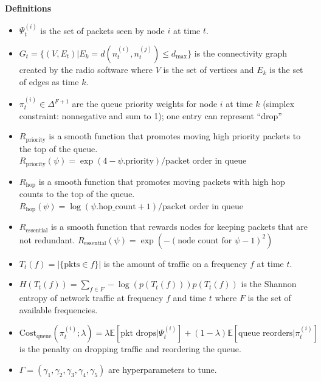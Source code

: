 \documentclass{article}
\begin{document}
\textbf{Definitions}
\begin{itemize}
    \item $\Psi_{t}^{(i)}$ is the set of packets seen by node $i$ at time $t$.
    \item $G_{t} = \{ (V, E_{t}) | E_{k} = d(n_{t}^{(i)}, n_{t}^{(j)}) \le d_{\text{max}} \}$ is the connectivity graph created by the radio software where $V$ is the set of vertices and $E_{k}$ is the set of edges as time $k$.
    \item $\pi_{t}^{(i)}\in\Delta^{F+1}$ are the queue priority weights for node $i$ at time $k$ (simplex constraint: nonnegative and sum to 1); one entry can represent ``drop''
    \item $R_{\text{priority}}$ is a smooth function that promotes moving high priority packets to the top of the queue. $R_{\text{priority}}(\psi) = \exp( 4 - \psi.\text{priority}) / \text{packet order in queue}$


    \item $R_{\text{hop}}$ is a smooth function that promotes moving packets with high hop counts to the top of the queue. $R_{\text{hop}}(\psi) = \log(\psi.\text{hop\_count} + 1) / \text{packet order in queue}$

    \item $R_{\text{essential}}$ is a smooth function that rewards nodes for keeping packets that are not redundant. $R_{\text{essential}}(\psi) = \exp(- (\text{node count for }\psi - 1)^{2})$

    \item $T_{t}(f) = | \{ \text{pkts} \in f\} |$ is the amount of traffic on a frequency $f$ at time $t$.
    \item $H(T_{t}(f))= \sum _{f \in F} -\log(p(T_{t}(f))) p(T_{t}(f))$ is the Shannon entropy of network traffic at frequency $f$ and time $t$ where $F$ is the set of available frequencies.
    \item $\text{Cost}_{\text{queue}}(\pi_{t}^{(i)}; \lambda) = \lambda \mathbb{E}[\text{pkt drops}| \Psi_{t}^{(i)}] + (1 - \lambda) \mathbb{E}[\text{queue reorders}| \pi_{t}^{(i)}]$ is the penalty on dropping traffic and reordering the queue.
    \item $\Gamma = (\gamma_{1}, \gamma_{2}, \gamma_{3}, \gamma_{4}, \gamma_{5})$ are hyperparameters to tune.
\end{itemize}


\end{document}
